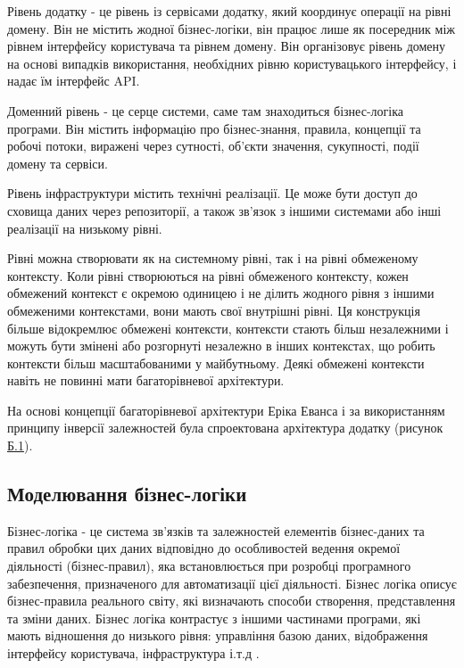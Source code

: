 Рівень додатку - це рівень із сервісами додатку,
який координує операції на рівні домену. Він не містить жодної бізнес-логіки,
він працює лише як посередник між рівнем інтерфейсу користувача та рівнем домену.
Він організовує рівень домену на основі випадків використання,
необхідних рівню користувацького інтерфейсу,
і надає їм інтерфейс API.

Доменний рівень - це серце системи, саме там знаходиться бізнес-логіка програми.
Він містить інформацію про бізнес-знання, правила, концепції та робочі потоки,
виражені через сутності, об'єкти значення, сукупності, події домену та сервіси.

Рівень інфраструктури містить технічні реалізації.
Це може бути доступ до сховища даних через репозиторії,
а також зв'язок з іншими системами або інші реалізації на низькому рівні.

Рівні можна створювати як на системному рівні, так і
на рівні обмеженому контексту. Коли рівні створюються на рівні
обмеженого контексту, кожен обмежений контекст є окремою
одиницею і не ділить жодного рівня з іншими обмеженими контекстами,
вони мають свої внутрішні рівні. Ця конструкція більше
відокремлює обмежені контексти, контексти стають більш незалежними
і можуть бути змінені або розгорнуті незалежно в
інших контекстах, що робить контексти більш масштабованими
у майбутньому. Деякі обмежені контексти навіть не повинні
мати багаторівневої архітектури.


На основі концепції багаторівневої архітектури Еріка Еванса і за
використанням принципу інверсії залежностей була 
спроектована архітектура додатку (рисунок \hyperref[b1]{Б.1}).

\subsection{Моделювання бізнес-логіки}

Бізнес-логіка - це система зв'язків та залежностей елементів бізнес-даних
та правил обробки цих даних відповідно до особливостей ведення окремої діяльності (бізнес-правил),
яка встановлюється при розробці програмного забезпечення,
призначеного для автоматизації цієї діяльності. Бізнес логіка описує бізнес-правила реального світу,
які визначають способи створення, представлення та зміни даних.
Бізнес логіка контрастує з іншими частинами програми,
які мають відношення до низького рівня: управління базою даних,
відображення інтерфейсу користувача, інфраструктура і.т.д \cite{business-def}.

